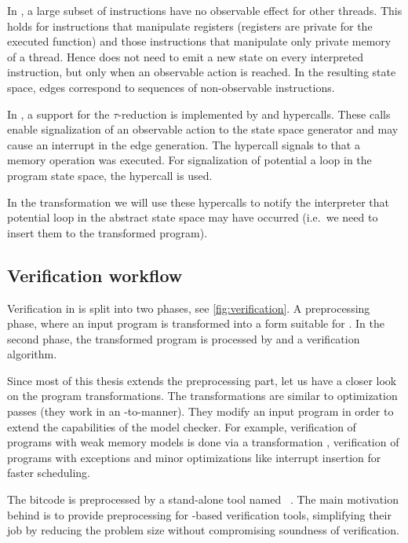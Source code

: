 In \LLVM, a large subset of instructions have no observable effect for other
threads. This holds for instructions that manipulate registers (registers are
private for the executed function) and those instructions that manipulate only
private memory of a thread. Hence \DIVINE does not need to emit a new state on
every interpreted instruction, but only when an observable action is reached. In
the resulting state space, edges correspond to sequences of non-observable
instructions.

In \DIVM, a support for the $\tau$-reduction is implemented by
 and  hypercalls. These calls enable
signalization of an observable action to the state space generator and may cause
an interrupt in the edge generation. The  hypercall
signals to \DIVM that a memory operation was executed. For signalization of
potential a loop in the program state space, the  hypercall
is used.

In the transformation we will use these hypercalls to notify the interpreter
that potential loop in the abstract state space may have occurred (i.e.~we need
to insert them to the transformed program).

\subsection{Verification workflow}

Verification in \DIVINE is split into two phases, see
\autoref{fig:verification}.  A preprocessing phase, where an input program is
transformed into a form suitable for \DIVM. In the second phase, the
transformed program is processed by \DIVM and a verification algorithm.

Since most of this thesis extends the preprocessing part, let us have a closer
look on the program transformations. The transformations are similar to \LLVM
optimization passes (they work in an \LLVM -to-\LLVM manner). They modify an
input program in order to extend the capabilities of the model checker. For
example, verification of programs with weak memory models is done via a
transformation \cite{Still16}, verification of programs with exceptions
\cite{Still17} and minor optimizations like interrupt insertion for faster
scheduling.

The \LLVM bitcode is preprocessed by a stand-alone tool named
\LART~\cite{Rockai15}. The main motivation behind \LART is to provide preprocessing for \LLVM
-based verification tools, simplifying their job by reducing the problem size
without compromising soundness of verification.

